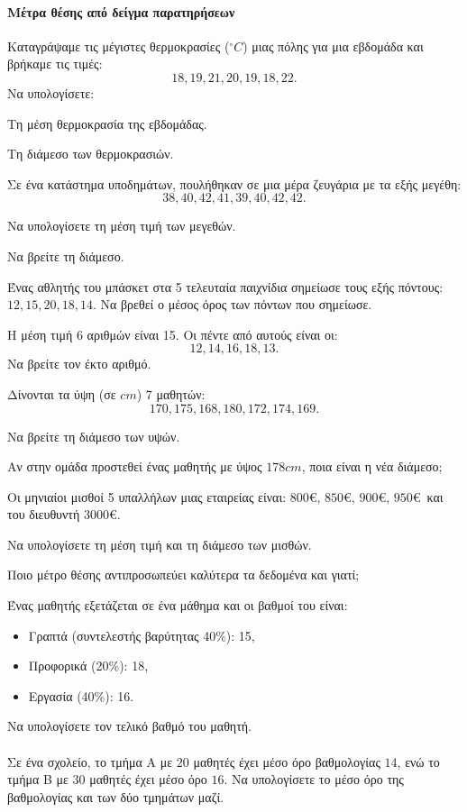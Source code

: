 \documentclass[11pt,a4paper,modern]{FFExercises}
\begin{document}
\paragraph{Μέτρα θέσης από δείγμα παρατηρήσεων}
\askhsh
Καταγράψαμε τις μέγιστες θερμοκρασίες ($^\circ C$) μιας πόλης για μια εβδομάδα και βρήκαμε τις τιμές: \[18, 19, 21, 20, 19, 18, 22.\] Να υπολογίσετε:
\begin{alist}
    \item Τη μέση θερμοκρασία της εβδομάδας.
    \item Τη διάμεσο των θερμοκρασιών.
\end{alist}

\askhsh
Σε ένα κατάστημα υποδημάτων, πουλήθηκαν σε μια μέρα ζευγάρια με τα εξής μεγέθη: \[38, 40, 42, 41, 39, 40, 42, 42.\]
\begin{alist}
    \item Να υπολογίσετε τη μέση τιμή των μεγεθών.
    \item Να βρείτε τη διάμεσο.
\end{alist}

\askhsh
Ένας αθλητής του μπάσκετ στα 5 τελευταία παιχνίδια σημείωσε τους εξής πόντους: $12, 15, 20, 18, 14$. Να βρεθεί ο μέσος όρος των πόντων που σημείωσε.

\askhsh
Η μέση τιμή 6 αριθμών είναι 15. Οι πέντε από αυτούς είναι οι: \[12, 14, 16, 18, 13.\] Να βρείτε τον έκτο αριθμό.

\askhsh
Δίνονται τα ύψη (σε $cm$) 7 μαθητών: \[170, 175, 168, 180, 172, 174, 169.\]
\begin{alist}
    \item Να βρείτε τη διάμεσο των υψών.
    \item Αν στην ομάδα προστεθεί ένας μαθητής με ύψος $178\si{cm}$, ποια είναι η νέα διάμεσο;
\end{alist}

\askhsh
Οι μηνιαίοι μισθοί 5 υπαλλήλων μιας εταιρείας είναι: $800$\euro, $850$\euro, $900$\euro, $950$\euro\ και του διευθυντή $3000$\euro.
\begin{alist}
    \item Να υπολογίσετε τη μέση τιμή και τη διάμεσο των μισθών.
    \item Ποιο μέτρο θέσης αντιπροσωπεύει καλύτερα τα δεδομένα και γιατί;
\end{alist}

\askhsh
Ένας μαθητής εξετάζεται σε ένα μάθημα και οι βαθμοί του είναι: 
\begin{itemize}[itemsep=0mm]
\item Γραπτά (συντελεστής βαρύτητας 40\%): 15, 
\item Προφορικά (20\%): 18, 
\item Εργασία (40\%): 16.
\end{itemize}
 Να υπολογίσετε τον τελικό βαθμό του μαθητή.\\\\
\askhsh
Σε ένα σχολείο, το τμήμα Α με $20$ μαθητές έχει μέσο όρο βαθμολογίας $14$, ενώ το τμήμα Β με $30$ μαθητές έχει μέσο όρο $16$. Να υπολογίσετε το μέσο όρο της βαθμολογίας και των δύο τμημάτων μαζί.\\\\
\end{document}
